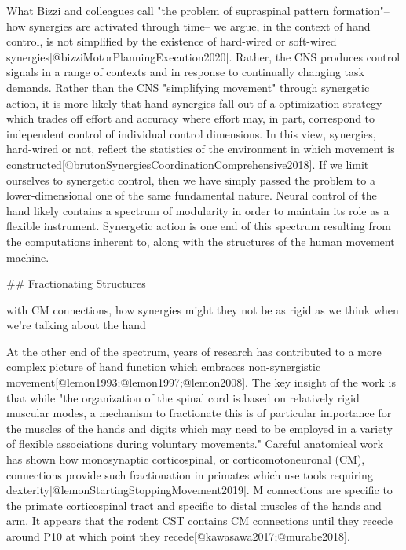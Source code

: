 \documentclass[../main.tex]{subfiles}
\begin{document}
{What Bizzi and colleagues call "the problem of supraspinal pattern formation"--how synergies are activated through time-- we argue, in the context of hand control, is not simplified by the existence of hard-wired or soft-wired synergies[@bizziMotorPlanningExecution2020]. Rather, the CNS produces control signals in a range of contexts and in response to continually changing task demands. Rather than the CNS "simplifying movement" through synergetic action, it is more likely that hand synergies fall out of a optimization strategy which trades off effort and accuracy where effort may, in part, correspond to independent control of individual control dimensions. In this view, synergies, hard-wired or not, reflect the statistics of the environment in which movement is constructed[@brutonSynergiesCoordinationComprehensive2018]. If we limit ourselves to synergetic control, then we have simply passed the problem to a lower-dimensional one of the same fundamental nature. Neural control of the hand likely contains a spectrum of modularity in order to maintain its role as a flexible instrument. Synergetic action is one end of this spectrum resulting from the computations inherent to, along with the structures of the human movement machine.

## Fractionating Structures

 with CM connections, how synergies might they not be as rigid as we think when we're talking about the hand 

 At the other end of the spectrum, years of research has contributed to a more complex picture of hand function which embraces non-synergistic movement[@lemon1993;@lemon1997;@lemon2008]. The key insight of the work is that while "the organization of the spinal cord is based on relatively rigid muscular modes, a mechanism to fractionate this is of particular importance for the muscles of the hands and digits which may need to be employed in a variety of flexible associations during voluntary movements." Careful anatomical work has shown how monosynaptic corticospinal, or corticomotoneuronal (CM), connections provide such fractionation in primates which use tools requiring dexterity[@lemonStartingStoppingMovement2019]. M connections are specific to the primate corticospinal tract and specific to distal muscles of the hands and arm. It appears that the rodent CST contains CM connections until they recede around P10 at which point they recede[@kawasawa2017;@murabe2018]. 

}
\end{document}
